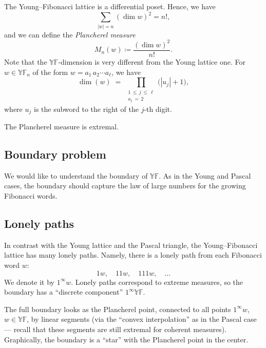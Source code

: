 \documentclass[letterpaper,11pt,oneside,reqno]{article}
\numberwithin{equation}{section}
\theoremstyle{definition}
\begin{document}
\subsection{}

The Young--Fibonacci lattice is a differential poset. Hence, we have
\begin{equation*}
	\sum_{|w|=n}(\dim w)^2=n!,
\end{equation*}
and we can define the \emph{Plancherel measure}
\begin{equation*}
	M_n(w)\coloneqq \frac{(\dim w)^2}{n!}.
\end{equation*}
Note that the $\mathbb{YF}$-dimension is very
different from the Young lattice one.
For $w \in \mathbb{YF}_n$ of the form
$w = a_1 \, a_2 \cdots a_\ell$, we have
\[
\dim(w)
\;=\;
\prod_{\substack{1 \,\leq\, j \,\leq\, \ell \\ a_j \,=\, 2}}
\bigl( |u_j| + 1 \bigr),
\]
where $u_j$ is the subword to the right of the $j$-th digit.

The Plancherel measure is extremal.

\subsection{Boundary problem}

We would like to understand the boundary of $\mathbb{YF}$.
As in the Young and Pascal cases, the boundary should capture the law of
large numbers for the growing Fibonacci words.

\subsection{Lonely paths}

In contrast with the Young lattice and the Pascal triangle,
the Young--Fibonacci lattice has many lonely paths.
Namely, there is a lonely path from each Fibonacci word $w$:
\begin{equation*}
	1w, \quad 11w, \quad 111w, \quad \ldots
\end{equation*}
We denote it by $1^\infty w$.
Lonely paths correspond to extreme measures,
so the boundary has a ``discrete component''
$1^\infty\mathbb{YF}$.

The full boundary looks as the Plancherel point,
connected to all points $1^\infty w$, $w\in\mathbb{YF}$,
by linear segments (via the ``convex interpolation'' as in the
Pascal case --- recall that these segments are still extremal
for coherent measures).
Graphically, the boundary is a ``star'' with the Plancherel point
in the center.
\end{document}
